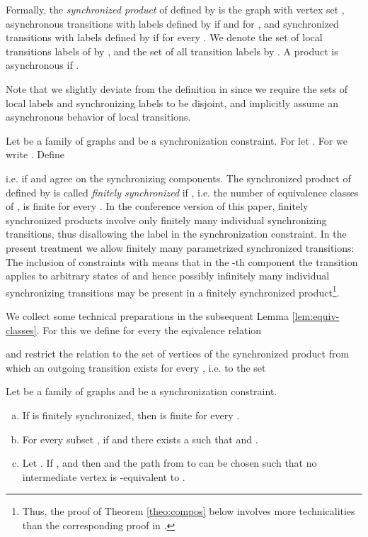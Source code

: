 \documentclass{LMCS}
\begin{document}
Formally, the \emph{synchronized product} of  defined
by  is the graph  with vertex set , 
asynchronous transitions with labels 
defined by  if  and
 for , and synchronized transitions with labels  defined by  if  for every .
We denote the set of local transitions labels  of  
by , and the set  of all transition labels by .
A product is asynchronous if .

Note that we slightly deviate from the definition in \cite{arn94} 
since we require the sets of local labels and synchronizing labels to be 
disjoint, and implicitly assume an asynchronous behavior of local transitions.
 
Let   be a family of graphs and 
 be a synchronization
constraint. For  let . 
For  we write .
Define 

i.e.  if  and  agree on the synchronizing components.
The synchronized product  of  defined by  is called 
\emph{finitely synchronized} if , i.e. the number 
of equivalence classes of , is finite for every .
In the conference version \cite{wt04} of this paper, finitely synchronized products involve only finitely 
many individual synchronizing transitions, thus disallowing the label  in
the synchronization constraint. In the present treatment we allow finitely many parametrized 
synchronized transitions: The inclusion of constraints  with  means that 
in the -th component the transition  applies to arbitrary states of  and hence 
possibly infinitely many individual synchronizing transitions may be present in a finitely 
synchronized product\footnote{Thus, the proof of Theorem \ref{theo:compos} below involves more technicalities
than the corresponding proof in \cite{wt04}.}.

We collect some technical preparations in the subsequent Lemma \ref{lem:equiv-classes}. For this
we define for every  the eqivalence relation 

and restrict the relation  to the set of vertices of the synchronized product from
which an outgoing transition exists for every , i.e. to the set


\begin{lem}\label{lem:equiv-classes}
Let   be a family of graphs and 
 be a synchronization
constraint. 
\begin{enumerate}[(a)]
\item If  is finitely synchronized, then  is finite for every .
\item For every subset ,
if  and 
there exists a  such that 
and .
\item Let . If 
 , 
 and  then  and the path from 
  to  can be chosen such that no intermediate vertex is -equivalent to 
 .
\end{enumerate}
\end{lem}
\end{document}

